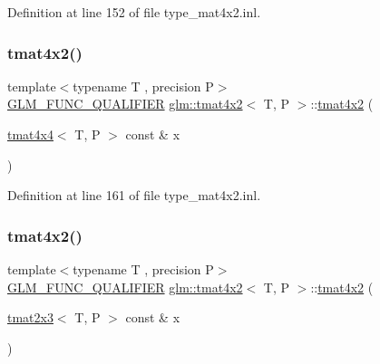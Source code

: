 Definition at line 152 of file type\+\_\+mat4x2.\+inl.

\mbox{\label{structglm_1_1tmat4x2_a746f9d523f75bee0286be20a38293a2d}} 
\subsubsection{\texorpdfstring{tmat4x2()}{tmat4x2()}\hspace{0.1cm}{\footnotesize\ttfamily [13/22]}}
{\footnotesize\ttfamily template$<$typename T , precision P$>$ \\
\mbox{\hyperlink{setup_8hpp_a33fdea6f91c5f834105f7415e2a64407}{G\+L\+M\+\_\+\+F\+U\+N\+C\+\_\+\+Q\+U\+A\+L\+I\+F\+I\+ER}} \mbox{\hyperlink{structglm_1_1tmat4x2}{glm\+::tmat4x2}}$<$ T, P $>$\+::\mbox{\hyperlink{structglm_1_1tmat4x2}{tmat4x2}} (\begin{DoxyParamCaption}\item[{\mbox{\hyperlink{structglm_1_1tmat4x4}{tmat4x4}}$<$ T, P $>$ const \&}]{x }\end{DoxyParamCaption})}



Definition at line 161 of file type\+\_\+mat4x2.\+inl.

\mbox{\label{structglm_1_1tmat4x2_acecefe71f4a19f72cf988f0858036d5f}} 
\subsubsection{\texorpdfstring{tmat4x2()}{tmat4x2()}\hspace{0.1cm}{\footnotesize\ttfamily [14/22]}}
{\footnotesize\ttfamily template$<$typename T , precision P$>$ \\
\mbox{\hyperlink{setup_8hpp_a33fdea6f91c5f834105f7415e2a64407}{G\+L\+M\+\_\+\+F\+U\+N\+C\+\_\+\+Q\+U\+A\+L\+I\+F\+I\+ER}} \mbox{\hyperlink{structglm_1_1tmat4x2}{glm\+::tmat4x2}}$<$ T, P $>$\+::\mbox{\hyperlink{structglm_1_1tmat4x2}{tmat4x2}} (\begin{DoxyParamCaption}\item[{\mbox{\hyperlink{structglm_1_1tmat2x3}{tmat2x3}}$<$ T, P $>$ const \&}]{x }\end{DoxyParamCaption})}



